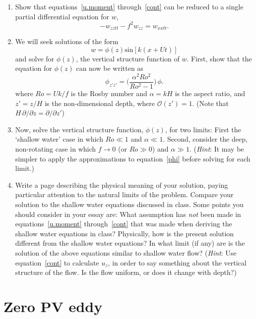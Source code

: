 \documentclass[11pt]{report}
\numberwithin{equation}{section}
\begin{document}
\begin{enumerate}
\item  Show that equations~\ref{u.moment} through~\ref{cont} can be reduced
  to a single partial differential equation for $w$,
  \begin{equation}
    -w_{zztt} - f^2 w_{zz} = w_{xxtt}. \label{w.eqn}
  \end{equation}
\item  We will seek solutions of the form
  \begin{equation}
    w = \phi(z) \mathrm{sin}[k (x + U t)]
  \end{equation}
  and solve for $\phi(z)$, the vertical structure function of $w$.  First,
  show that the equation for $\phi(z)$ can now be written as
  \begin{equation}
    \phi_{z'z'} = \biggl(\frac{\alpha^2 Ro^2}{Ro^2-1} \biggr) \, \phi .
    \label{phi}
  \end{equation}
  where $Ro = U k / f$ is the Rosby number and $\alpha = k H$ is the aspect
  ratio, and $z' = z/H$ is the non-dimensional depth, where
  $\mathcal{O}(z') = 1$.  (Note that $H \,\partial / \partial z = 
  \partial / \partial z'$)
\item  Now, solve the vertical structure function, $\phi(z)$, for two
  limits: First the `shallow water' case in which $Ro \ll 1$ and $\alpha
  \ll 1$.  Second, consider the deep, non-rotating case in which
  $f\rightarrow0$ (or $Ro \gg 0$) and $\alpha \gg 1$. ({\em Hint}: It may
  be simpler to apply the approximations to equation~\ref{phi} before
  solving for each limit.)
\item  Write a page describing the physical meaning of your solution, paying particular attention to the natural limits of the problem.  Compare your solution to the shallow water equations discussed in class.  Some points you should consider in your essay are:  What assumption has {\em not} been made in equations~\ref{u.moment} through~\ref{cont} that was made when deriving the shallow water equations in class?  Physically, how is the present solution different from the shallow water equations?  In what limit (if any) are is the solution of the above equations similar to shallow water flow?  ({\em Hint}: Use equation~\ref{cont} to calculate $u_z$, in order to say something about the vertical structure of the flow.  Is the flow uniform, or does it change with depth?)
\end{enumerate}

\section{Zero PV eddy}
\label{prob:zero_pv_eddy}
\end{document}
